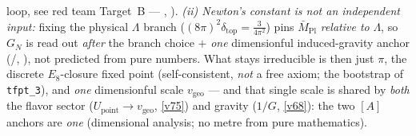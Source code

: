 \documentclass[11pt,a4paper]{article}
\begin{document}
loop, see red team Target~B --- , ).
\emph{(ii) Newton's constant is not an \emph{independent} input:} fixing the physical $\Lambda$ branch
($(8\pi)^2\delta_{\mathrm{top}}=\tfrac{3}{4\pi^2}$) pins $\bar M_{\mathrm{Pl}}$ \emph{relative to} $\Lambda$, so
$G_N$ is read out \emph{after} the branch choice $+$ \emph{one} dimensionful induced-gravity anchor (\mE/\mC,
), not predicted from pure numbers. What stays irreducible is then
just $\pi$, the discrete $E_8$-closure fixed point (self-consistent, \emph{not} a free axiom; the bootstrap of
\texttt{tfpt\_3}), and \emph{one} dimensionful scale $v_{\mathrm{geo}}$ --- and that single scale is shared by
\emph{both} the flavor sector ($U_{\mathrm{point}}\to v_{\mathrm{geo}}$, \vref{v75}) and gravity ($1/G$, \vref{v68}): the two
$[A]$ anchors are \emph{one} (dimensional analysis; no metre from pure mathematics).
\end{document}
